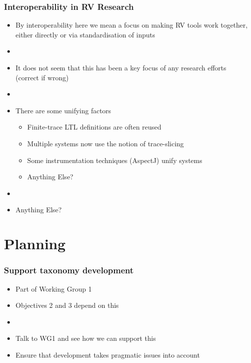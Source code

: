 \documentclass{beamer}
\newcommand{\addhere}{{\color{red} Anything Else?}}
\begin{document}
\begin{frame}
\frametitle{Interoperability in RV Research}
\begin{itemize}
	\item By interoperability here we mean a focus on making RV tools work together, either directly or via standardisation of inputs
	\item[]
	\item It does not seem that this has been a key focus of any research efforts (correct if wrong)
	\item[]
	\item There are some unifying factors
	\begin{itemize}
		\item Finite-trace LTL definitions are often reused
		\item Multiple systems now use the notion of trace-slicing
		\item Some instrumentation techniques (AspectJ) unify systems
		\item \addhere{}
	\end{itemize}
	\item[]
	\item \addhere{}
\end{itemize}
\end{frame}

\section{Planning}

\begin{frame}
\frametitle{Support taxonomy development}
\begin{itemize}
	\item Part of Working Group 1
	\item Objectives 2 and 3 depend on this
	\item[]
	\item Talk to WG1 and see how we can support this
	\item Ensure that development takes pragmatic issues into account
\end{itemize}
\end{frame}
\end{document}
